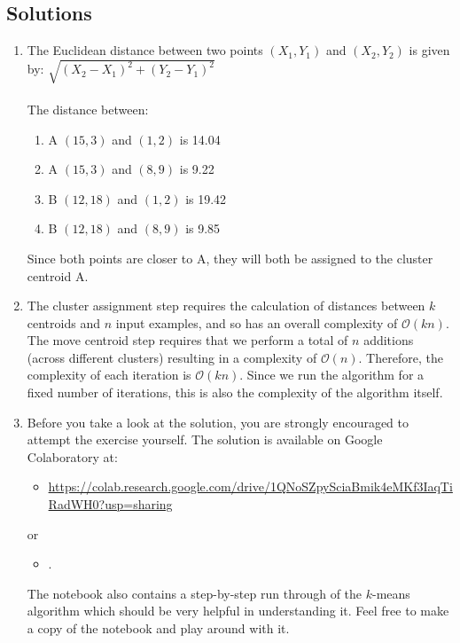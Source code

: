 \subsection{Solutions}

\begin{enumerate}

\item The Euclidean distance between two points $(X_1, Y_1)$ and $(X_2, Y_2)$ is given by: $\sqrt{ (X_2 - X_1)^2 + (Y_2 - Y_1)^2 }$
\\ \\
The distance between: 
\begin{enumerate}
\item A $(15, 3)$  and $(1, 2)$ is 14.04
\item A $(15, 3)$  and $(8, 9)$ is 9.22
\item B $(12, 18)$ and $(1, 2)$ is 19.42
\item B $(12, 18)$ and $(8, 9)$ is 9.85
\end{enumerate}

Since both points are closer to A, they will both be assigned to the cluster centroid A. 

\item  The cluster assignment step requires the calculation of distances between $k$ centroids and $n$ input examples, and so has an overall complexity of $\mathcal{O}(kn)$. The move centroid step requires that we perform a total of $n$ additions (across different clusters) resulting in a complexity of $\mathcal{O}(n)$. Therefore, the complexity of each iteration is $\mathcal{O}(kn)$. Since we run the algorithm for a fixed number of iterations, this is also the complexity of the algorithm itself.

\item Before you take a look at the solution, you are strongly encouraged to attempt the exercise yourself. The solution is available on Google Colaboratory at: 
\begin{itemize} 
\item {\footnotesize\url{https://colab.research.google.com/drive/1QNoSZpySciaBmik4eMKf3IaqTiRadWH0?usp=sharing}}
\end{itemize}

 or 
\begin{itemize}
 \item {\footnotesize \supplementurlkm}. 
\end{itemize}

The notebook also contains a step-by-step run through of the $k$-means algorithm which should be very helpful in understanding it. Feel free to make a copy of the notebook and play around with it. 

\end{enumerate}



